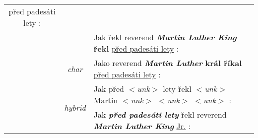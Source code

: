 \documentclass[11pt]{article}
\newcommand{\bi}[1]{\textbf{\textit{#1}}}
\newcommand{\source}[1]{\bi{#1}}
\newcommand{\correct}[1]{\bi{\color{blue} #1}}
\newcommand{\wrong}[1]{\textbf{\color{red} #1}}
\newcommand{\close}[1]{\underline{\color{brown} #1}}
\newcommand{\unk}{$<${\it unk}$>$}
\begin{document}
\begin{table*}
{\begin{tabular}{c|c|p{16cm}}
p\u{r}ed pades\'ati lety : \\
&  & Jak \u{r}ekl reverend \correct{Martin Luther King} \wrong{\u{r}ekl}
\close{p\u{r}ed pades\'ati lety} : \\
  \cline{2-3}
& \it{char} & Jako reverend \correct{Martin Luther} \wrong{kr\'al \u{r}\'ikal}
\close{p\u{r}ed pades\'ati lety} : \\
  \cline{2-3}
& \multirow{2}{*}{\it{hybrid}} & Jak p\u{r}ed \unk{} lety \u{r}ekl \unk{} Martin
\unk{} \unk{} \unk{} : \\
&  & Jak \correct{p\u{r}ed pades\'ati lety} \u{r}ekl reverend \correct{Martin
Luther King} \close{Jr.} : \\
  \hline
  \hline

\end{tabular}}
\end{table*}
\end{document}
